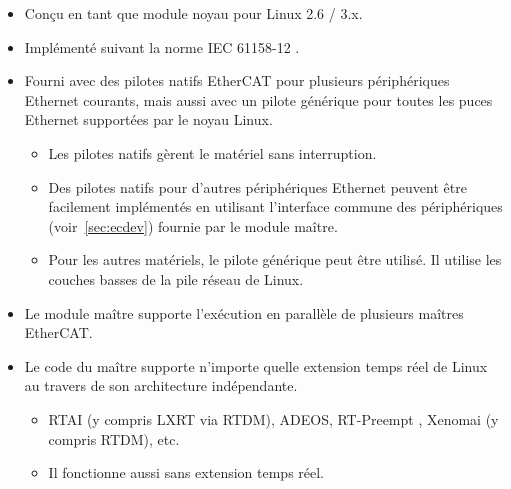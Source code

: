 \documentclass[a4paper,12pt,BCOR=6mm,bibtotoc,idxtotoc]{scrbook}
\begin{document}
\begin{itemize}

\item Con\c{c}u en tant que module noyau pour Linux 2.6 / 3.x.

\item Impl\'ement\'e suivant la norme IEC 61158-12 \cite{dlspec}
  \cite{alspec}.

\item Fourni avec des pilotes natifs EtherCAT pour plusieurs
  p\'eriph\'eriques Ethernet courants, mais aussi avec un pilote
  g\'en\'erique pour toutes les puces Ethernet support\'ees par le
  noyau Linux.

  \begin{itemize}

  \item Les pilotes natifs g\`erent le mat\'eriel sans interruption.

  \item Des pilotes natifs pour d'autres p\'eriph\'eriques Ethernet
    peuvent \^etre facilement impl\'ement\'es en utilisant l'interface
    commune des p\'eriph\'eriques (voir~\autoref{sec:ecdev}) fournie
    par le module ma\^itre.

  \item Pour les autres mat\'eriels, le pilote g\'en\'erique peut
    \^etre utilis\'e.  Il utilise les couches basses de la pile
    r\'eseau de Linux.

  \end{itemize}

\item Le module ma\^itre supporte l'ex\'ecution en parall\`ele de plusieurs ma\^itres EtherCAT.

\item Le code du ma\^itre supporte n'importe quelle extension temps r\'eel de Linux
  au travers de son architecture ind\'ependante.


  \begin{itemize}

  \item RTAI \cite{rtai}
  (y compris LXRT via RTDM), ADEOS, RT-Preempt \cite{rt-preempt}, Xenomai
  (y compris RTDM), etc.

  \item Il fonctionne aussi sans extension temps r\'eel.

  \end{itemize}


\end{itemize}
\end{document}
